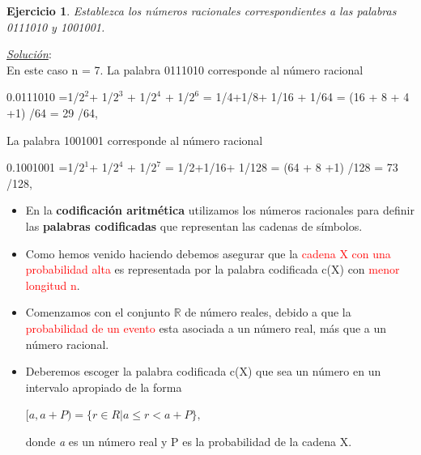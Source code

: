 \documentclass{beamer}
\theoremstyle{plain}
\theoremstyle{example}
\newtheorem{ejercicio} [Ejercicio]{Ejercicio}
\theoremstyle{example}
\begin{document}

\begin{frame}  \small 

\begin{ejercicio}
Establezca los números racionales correspondientes a las palabras 0111010 y 1001001.
\end{ejercicio}
\pause
\textit{\underline{Solución}}:\\

En este caso n = 7. La palabra 0111010 corresponde al número racional 

\begin{center}
0.0111010 =1/$2^2$+ 1/$2^3$ + 1/$2^4$ + 1/$2^6$ = 1/4+1/8+ 1/16 + 1/64 = (16 + 8 + 4 +1) /64 = 29 /64,
\end{center}

La palabra 1001001 corresponde al número racional 

\begin{center}
0.1001001 =1/$2^1$+ 1/$2^4$ + 1/$2^7$ = 1/2+1/16+ 1/128  = (64 + 8 +1) /128 = 73 /128,
\end{center}


\end{frame} 


\begin{frame}  \footnotesize 

\begin{itemize}
\item En la \textbf{codificación aritmética} utilizamos los números racionales para definir las \textbf{palabras codificadas} que representan las cadenas de símbolos.

\item Como hemos venido haciendo debemos asegurar que la \textcolor{red}{cadena X con una probabilidad alta} es representada por la palabra codificada c(X) con \textcolor{red}{menor longitud n}.

\item Comenzamos con el conjunto $\mathbb{R}$ de número reales, debido a que la \textcolor{red}{probabilidad de un evento} esta asociada a un número real, más que a un número racional. 

\item Deberemos escoger la palabra codificada c(X) que sea un número en un intervalo apropiado de la forma

\begin{center}
$[a, a + P ) = \{r \in R | a \leq r < a + P \},$
\end{center}

donde \textit{a} es un número real y P es la probabilidad de la cadena X. 

\end{itemize}


\end{frame} 
\end{document}
